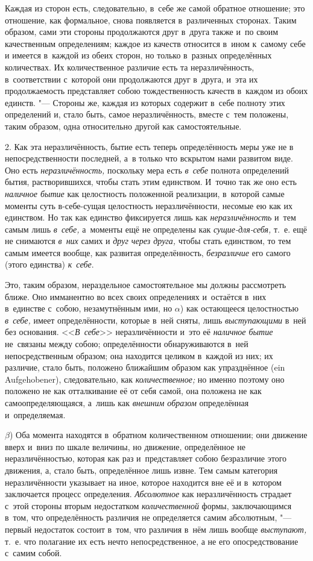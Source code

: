 Каждая из сторон есть, следовательно, в~себе же самой обратное отношение; это
отношение, как формальное, снова появляется в~различенных сторонах. Таким
образом, сами эти стороны продолжаются друг в~друга также и~по своим
качественным определениям; каждое из качеств относится в~ином к~самому себе и
имеется в~каждой из обеих сторон, но только в~разных определённых количествах.
Их количественное различие есть та неразличённость, в~соответствии с~которой
они продолжаются друг в~друга, и~эта их продолжаемость представляет собою
тождественность качеств в~каждом из обоих единств. "--- Стороны же, каждая из
которых содержит в~себе полноту этих определений и, стало быть, самое
неразличённость, вместе с~тем положены, таким образом, одна относительно
другой как самостоятельные.

2. Как эта неразличённость, бытие есть теперь определённость меры уже не в
непосредственности последней, а~в только что вскрытом нами развитом виде. Оно
есть {\em неразличённость,} поскольку мера есть {\em в~себе} полнота
определений бытия, растворившихся, чтобы стать этим единством. И~точно так же
оно есть {\em наличное бытие} как целостность положенной реализации, в~которой
самые моменты суть в-себе-сущая целостность неразличённости, несомые ею как их
единством. Но так как единство фиксируется лишь как {\em неразличённость} и~тем
самым лишь {\em в~себе,} а~моменты ещё не определены как {\em сущие-для-себя,}
т.~е. ещё не снимаются {\em в~них} самих и {\em друг через друга,} чтобы стать
единством, то тем самым имеется вообще, как развитая определённость, {\em
безразличие} его самого (этого единства) {\em к~себе}.

Это, таким образом, нераздельное самостоятельное мы должны рассмотреть ближе.
Оно имманентно во всех своих определениях и~остаётся в~них в~единстве с~собою,
незамутнённым ими, но $\alpha$) как остающееся целостностью {\em в~себе,} имеет
определённости, которые в~ней сняты, лишь {\em выступающими} в~ней без
основания. <<{\em В~себе}>> неразличённости и~это её {\em наличное бытие}
не~связаны между собою; определённости обнаруживаются в~ней непосредственным
образом; она находится целиком в~каждой из них; их различие, стало быть,
положено ближайшим образом как упразднённое (ein Auf\-ge\-ho\-be\-ner),
следовательно, как {\em количественное;} но именно поэтому оно положено не как
отталкивание её от себя самой, она положена не как самоопределяющаяся, а~лишь
как {\em внешним образом} определённая и~определяемая.

$\beta$) Оба момента находятся в~обратном количественном отношении; они
движение вверх и~вниз по шкале величины, но движение, определённое не
неразличённостью, которая как раз и~представляет собою безразличие этого
движения, а, стало быть, определённое лишь извне. Тем самым категория
неразличённости указывает на иное, которое находится вне её и
в~котором заключается процесс определения. {\em Абсолютное} как неразличённость
страдает с~этой стороны вторым недостатком {\em количественной} формы,
заключающимся в~том, что определённость различия не определяется самим
абсолютным, "--- первый недостаток состоит в~том, что различия в~нём лишь
вообще {\em выступают,} т.~е. что полагание их есть нечто непосредственное, а
не его опосредствование с~самим собой.

